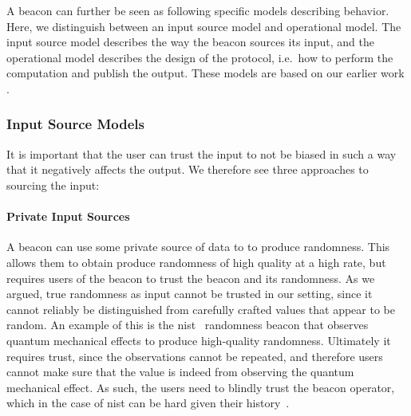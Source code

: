 A beacon can further be seen as following specific models describing behavior. Here, we distinguish between an input source model and operational model. The input source model describes the way the beacon sources its input, and the operational model describes the design of the protocol, i.e.\ how to perform the computation and publish the output. These models are based on our earlier work .

\subsubsection{Input Source Models}
It is important that the user can trust the input to not be biased in such a way that it negatively affects the output. We therefore see three approaches to sourcing the input:

\paragraph{Private Input Sources} A beacon can use some private source of data to to produce randomness. This allows them to obtain produce randomness of high quality at a high rate, but requires users of the beacon to trust the beacon and its randomness.
As we argued, true randomness as input cannot be trusted in our setting, since it cannot reliably be distinguished from carefully crafted values that appear to be random.
An example of this is the \gls{nist}~\cite{nistbeacon} randomness beacon that observes quantum mechanical effects to produce high-quality randomness.
Ultimately it requires trust, since the observations cannot be repeated, and therefore users cannot make sure that the value is indeed from observing the quantum mechanical effect.
As such, the users need to blindly trust the beacon operator, which in the case of \gls{nist} can be hard given their history~\cite{nytimes-nsabackdoors, nytimes-nsaconstants, nist2014backdoor}.


